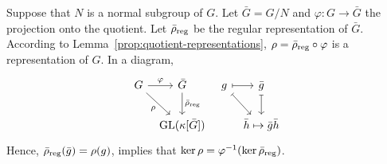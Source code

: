 \begin{rem}\label{rem:quotient-regular-representation}
    Suppose that $N$ is a normal subgroup of $G$. Let $\bar G=G/N$ and $\varphi\colon G\to\bar G$ the projection onto the quotient. Let $\rrho[\bar\rho]$ be the regular representation of $\bar G$. According to Lemma~\ref{prop:quotient-representations}, $\rho=\rrho[\bar\rho]\circ\varphi$ is a representation of $G$. In a diagram,
    $$
        \begin{tikzcd}[column sep=tiny]
            G
                    \arrow[r,"\varphi"]
                    \arrow[rd,"\rho"']
                &\bar G
                    \arrow[d,"{\rrho[\bar\rho]}"]
                &g
                    \arrow[r,mapsto]
                    \arrow[rd,mapsto]
                &\bar g
                    \arrow[d,mapsto]\\
                &{\Aut(\kappa[\bar G])}
                &&\bar h\mapsto\bar g\bar h
        \end{tikzcd}
    $$
    Hence, $\rrho[\bar\rho](\bar g)=\rho(g)$,  implies that $\ker\rho=\varphi^{-1}(\ker\rrho[\bar\rho])$.
\end{rem}

